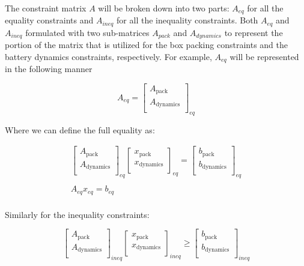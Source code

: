 \documentclass[letterpaper, 10pt, conference]{IEEEtran}
\begin{document}
The constraint matrix \(A\) will be broken down into two parts:
\(A_{eq}\) for all the equality constraints and \(A_{ineq}\) for all the
inequality constraints. Both \(A_{eq}\) and \(A_{ineq}\) formulated with
two sub-matrices \(A_{pack}\) and \(A_{dynamics}\) to represent the
portion of the matrix that is utilized for the box packing constraints
and the battery dynamics constraints, respectively. For example,
\(A_{eq}\) will be represented in the following manner

\[
A_{eq} =
\begin{bmatrix}
    A_{\textrm{pack}}     \\
    A_{\textrm{dynamics}} \\
\end{bmatrix}_{eq}
\]

Where we can define the full equality as:

\[
\begin{array}{c}
    \begin{bmatrix}
        A_{\textrm{pack}}     \\
        A_{\textrm{dynamics}} \\
    \end{bmatrix}_{eq}
    \begin{bmatrix}
        x_{\textrm{pack}}     \\
        x_{\textrm{dynamics}} \\
    \end{bmatrix}_{eq} =
    \begin{bmatrix}
        b_{\textrm{pack}}     \\
        b_{\textrm{dynamics}} \\
    \end{bmatrix}_{eq} \\
    \\
    A_{eq} x_{eq} = b_{eq} \\
\end{array}
\]

Similarly for the inequality constraints:

\[
\begin{bmatrix}
    A_{\textrm{pack}}     \\
    A_{\textrm{dynamics}} \\
\end{bmatrix}_{ineq}
\begin{bmatrix}
    x_{\textrm{pack}}     \\
    x_{\textrm{dynamics}} \\
\end{bmatrix}_{ineq} \geq
\begin{bmatrix}
    b_{\textrm{pack}}     \\
    b_{\textrm{dynamics}} \\
\end{bmatrix}_{ineq}
\]
\end{document}
